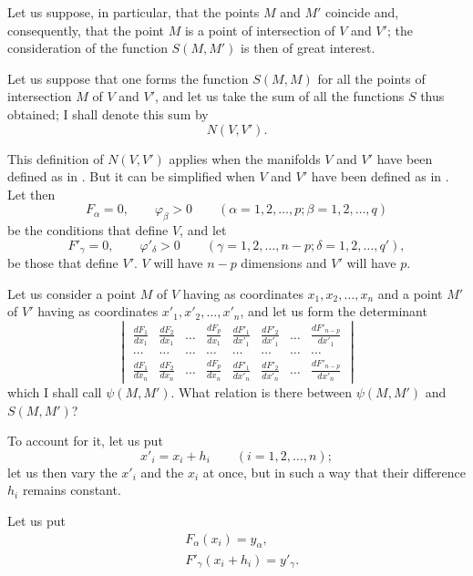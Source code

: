 \documentclass{article}
\begin{document}
Let us suppose, in particular, that the points $M$ and $M'$ coincide and, consequently, that the point $M$ is a point of intersection of $V$ and $V'$; the consideration of the function $S(M, M')$ is then of great interest.

Let us suppose that one forms the function $S(M, M)$ for all the points of intersection $M$ of $V$ and $V'$, and let us take the sum of all the functions $S$ thus obtained; I shall denote this sum by
\[
N(V, V').
\]

This definition of $N(V, V')$ applies when the manifolds $V$ and $V'$ have been defined as in . But it can be simplified when $V$ and $V'$ have been defined as in .
Let then
\[
F_{\alpha} = 0, \qquad \varphi_{\beta} > 0 \qquad (\alpha = 1, 2, \ldots, p; \beta = 1, 2, \ldots, q)
\]
be the conditions that define $V$, and let
\[
F'_{\gamma} = 0, \qquad \varphi'_{\delta} > 0 \qquad (\gamma = 1, 2, \ldots, n-p; \delta = 1, 2, \ldots, q'),
\]
be those that define $V'$. $V$ will have $n-p$ dimensions and $V'$ will have $p$.

Let us consider a point $M$ of $V$ having as coordinates $x_{1}, x_{2}, \ldots, x_{n}$ and a point $M'$ of $V'$ having as coordinates $x'_{1}, x'_{2}, \ldots, x'_{n}$, and let us form the determinant
\[
\begin{vmatrix}
\frac{dF_{1}}{dx_{1}} & \frac{dF_{2}}{dx_{1}} & \ldots & \frac{dF_{p}}{dx_{1}} & \frac{dF'_{1}}{dx'_{1}} & \frac{dF'_{2}}{dx'_{1}} & \ldots & \frac{dF'_{n-p}}{dx'_{1}} \\[1ex]
\ldots & \ldots & \ldots & \ldots & \ldots & \ldots & \ldots & \ldots \\[1ex]
\frac{dF_{1}}{dx_{n}} & \frac{dF_{2}}{dx_{n}} & \ldots & \frac{dF_{p}}{dx_{n}} & \frac{dF'_{1}}{dx'_{n}} & \frac{dF'_{2}}{dx'_{n}} & \ldots & \frac{dF'_{n-p}}{dx'_{n}}
\end{vmatrix}
\]
which I shall call $\psi(M, M')$. What relation is there between $\psi(M, M')$ and $S(M, M')$?

To account for it, let us put
\[
x'_{i} = x_{i} + h_{i} \qquad (i = 1, 2, \ldots, n);
\]
let us then vary the $x'_{i}$ and the $x_{i}$ at once, but in such a way that their difference $h_{i}$ remains constant.

Let us put
\[
\begin{aligned}
&F_{\alpha}(x_{i}) = y_{\alpha},\\
&F'_{\gamma}(x_{i} + h_{i}) = y'_{\gamma}.
\end{aligned}
\]
\end{document}
